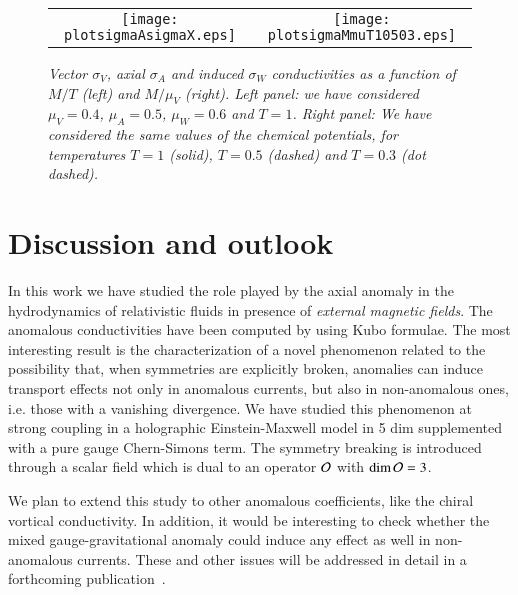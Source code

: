 \documentclass[epj]{webofc}
\begin{document}
\begin{figure*}[htb]
\begin{tabular}{cc}
\texttt{[image: plotsigmaAsigmaX.eps]} & 
\texttt{[image: plotsigmaMmuT10503.eps]}
\end{tabular}
\caption{\it Vector $\sigma_V$, axial $\sigma_A$ and induced $\sigma_W$ conductivities as a function of $M/T$ (left) and $M/\mu_V$ (right). Left panel: we have considered $\mu_V=0.4$, $\mu_A=0.5$, $\mu_W=0.6$ and $T=1$. Right panel: We have considered the same values of the chemical potentials, for temperatures $T=1$ (solid), $T=0.5$ (dashed) and $T=0.3$ (dot dashed).}
\label{fig:conductivities}
\end{figure*}


\section{Discussion and outlook}
\label{sec:conclusions}

In this work we have studied the role played by the axial anomaly in the hydrodynamics of relativistic fluids in presence of {\it external magnetic fields}. The anomalous conductivities have been computed by using Kubo formulae. The most interesting result is the characterization of a novel phenomenon related to the possibility that, when symmetries are explicitly broken, anomalies can induce transport effects not only in anomalous currents, but also in non-anomalous ones, i.e. those with a vanishing divergence. We have studied this phenomenon at strong coupling in a holographic Einstein-Maxwell model in 5 dim supplemented with a pure gauge Chern-Simons term. The symmetry breaking is introduced through a scalar field which is dual to an operator ${\cal O}$ with $\dim {\cal O} = 3$. 

We plan to extend this study to other anomalous coefficients, like the chiral vortical conductivity. In addition, it would be interesting to check whether the mixed gauge-gravitational anomaly could induce any effect as well in non-anomalous currents. These and other issues will be addressed in detail in a forthcoming publication~\cite{Megias:workinprogress}.



%
% 
%
%
\end{document}
